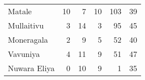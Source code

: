 \begin{tabular}{lrrrrr}
Matale       &          10 &           7 &           10 &              103 &          39 \\
Mullaitivu   &           3 &          14 &            3 &               95 &          45 \\
Moneragala   &           2 &           9 &            5 &               52 &          40 \\
Vavuniya     &           4 &          11 &            9 &               51 &          47 \\
Nuwara Eliya &           0 &          10 &            9 &                1 &          35 \\
\bottomrule
\end{tabular}
